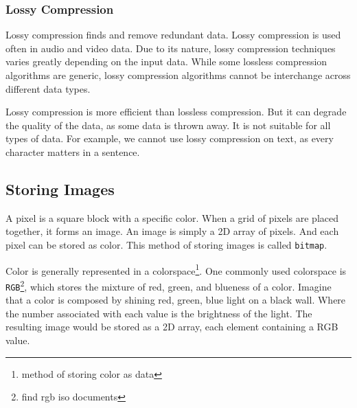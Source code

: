 \documentclass{article}
\begin{document}
\subsubsection{Lossy Compression}
Lossy compression finds and remove redundant data.
Lossy compression is used often in audio and video data.
Due to its nature, lossy compression techniques varies greatly depending on the input data.
While some lossless compression algorithms are generic, lossy compression algorithms cannot be interchange across different data types.

Lossy compression is more efficient than lossless compression.
But it can degrade the quality of the data, as some data is thrown away.
It is not suitable for all types of data.
For example, we cannot use lossy compression on text, as every character matters in a sentence.

\subsection{Storing Images}
A pixel is a square block with a specific color.
When a grid of pixels are placed together, it forms an image.
An image is simply a 2D array of pixels.
And each pixel can be stored as color.
This method of storing images is called \texttt{bitmap}.

Color is generally represented in a colorspace\footnote{method of storing color as data}.
One commonly used colorspace is \texttt{RGB}\footnote{find rgb iso documents}, which stores the mixture of red, green, and blueness of a color.
Imagine that a color is composed by shining red, green, blue light on a black wall.
Where the number associated with each value is the brightness of the light.
The resulting image would be stored as a 2D array, each element containing a RGB value.
\end{document}

